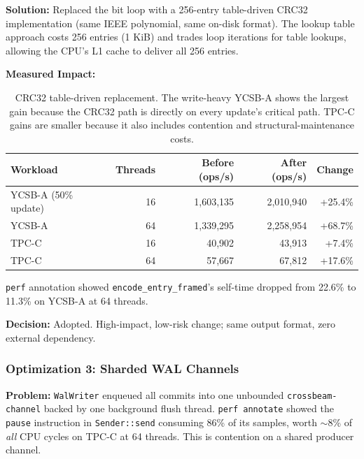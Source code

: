 \documentclass[11pt]{article}
\newcommand{\code}[1]{\texttt{#1}}
\begin{document}
\textbf{Solution:}
Replaced the bit loop with a 256-entry table-driven CRC32 implementation (same IEEE
polynomial, same on-disk format). The lookup table approach costs 256 entries (1 KiB) and
trades loop iterations for table lookups, allowing the CPU's L1 cache to deliver all 256
entries.

\textbf{Measured Impact:}

\begin{table}[h]
\centering
\small
\begin{tabular}{lrrrr}
\toprule
\textbf{Workload} & \textbf{Threads} & \textbf{Before (ops/s)} & \textbf{After (ops/s)} & \textbf{Change} \\
\midrule
YCSB-A (50\% update) & 16 & 1,603,135 & 2,010,940 & +25.4\% \\
YCSB-A & 64 & 1,339,295 & 2,258,954 & +68.7\% \\
TPC-C & 16 & 40,902 & 43,913 & +7.4\% \\
TPC-C & 64 & 57,667 & 67,812 & +17.6\% \\
\bottomrule
\end{tabular}
\caption{CRC32 table-driven replacement. The write-heavy YCSB-A shows the largest gain because
the CRC32 path is directly on every update's critical path. TPC-C gains are smaller because
it also includes contention and structural-maintenance costs.}
\label{tab:crc32_impact}
\end{table}

\code{perf} annotation showed \code{encode\_entry\_framed}'s self-time dropped from
22.6\% to 11.3\% on YCSB-A at 64 threads.

\textbf{Decision:} Adopted. High-impact, low-risk change; same output format, zero
external dependency.

\subsubsection{Optimization 3: Sharded WAL Channels}

\textbf{Problem:}
\code{WalWriter} enqueued all commits into one unbounded \code{crossbeam-channel} backed
by one background flush thread. \code{perf annotate} showed the \code{pause} instruction
in \code{Sender::send} consuming 86\% of its samples, worth $\sim$8\% of \emph{all} CPU
cycles on TPC-C at 64 threads. This is contention on a shared producer channel.
\end{document}
